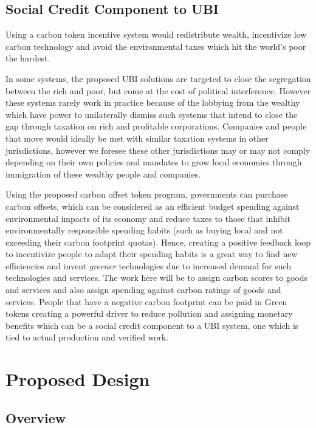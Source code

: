 \documentclass{article}
\begin{document}
\subsection{Social Credit Component to UBI}

Using a carbon token incentive system would redistribute wealth, incentivize low carbon technology and avoid the environmental taxes which hit the world’s poor the hardest.

In some systems, the proposed UBI solutions are targeted to close the segregation between the rich and poor, but come at the cost of political interference. However these systems rarely work in practice because of the lobbying from the wealthy which have power to unilaterally dismiss such systems that intend to close the gap through taxation on rich and profitable corporations. Companies and people that move would ideally be met with similar taxation systems in other jurisdictions, however we foresee these other jurisdictions may or may not comply depending on their own policies and mandates to grow local economies through immigration of these wealthy people and companies.

Using the proposed carbon offset token program, governments can purchase carbon offsets, which can be considered as an efficient budget spending against environmental impacts of its economy and reduce taxes to those that inhibit environmentally responsible spending habits (such as buying local and not exceeding their carbon footprint quotas). Hence, creating a positive feedback loop to incentivize people to adapt their spending habits is a great way to find new efficiencies and invent \emph{greener} technologies due to increased demand for such technologies and services. The work here will be to assign carbon scores to goods and services and also assign spending against carbon ratings of goods and services. People that have a negative carbon footprint can be paid in Green tokens creating a powerful driver to reduce pollution and assigning monetary benefits which can be a social credit component to a UBI system, one which is tied to actual production and verified work.

\section{Proposed Design}

\subsection{Overview}
\end{document}

